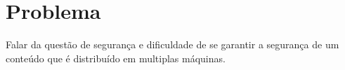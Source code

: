 \section{Problema}

Falar da questão de segurança e dificuldade de se garantir a segurança de um conteúdo que é distribuído em multiplas máquinas.